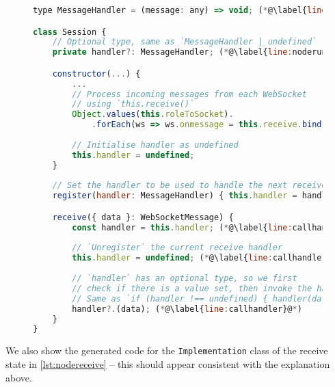 \begin{figure}[!h]
\begin{lstlisting}[language=javascript,tabsize=2]
type MessageHandler = (message: any) => void; (*@\label{line:msghandler}@*)

class Session {
	// Optional type, same as `MessageHandler | undefined`
	private handler?: MessageHandler; (*@\label{line:noderuntimehandler}@*)

	constructor(...) {
		...
		// Process incoming messages from each WebSocket
		// using `this.receive()`
		Object.values(this.roleToSocket).
			.forEach(ws => ws.onmessage = this.receive.bind(this)); (*@\label{line:wsbind}@*)
			
		// Initialise handler as undefined
		this.handler = undefined;
	}
	
	// Set the handler to be used to handle the next receive event
	register(handler: MessageHandler) { this.handler = handler; } (*@\label{line:register}@*)

	receive({ data }: WebSocketMessage) {
		const handler = this.handler; (*@\label{line:callhandlerstart}@*)
		
		// `Unregister` the current receive handler
		this.handler = undefined; (*@\label{line:callhandler2}@*)
		
		// `handler` has an optional type, so we first
		// check if there is a value set, then invoke the handler.
		// Same as `if (handler !== undefined) { handler(data); }`
		handler?.(data); (*@\label{line:callhandler}@*)
	}
}
\end{lstlisting}
\label{lst:noderuntimewsmsg}
\end{figure}

We also show the generated code for the \texttt{Implementation}
class of the receive state in \cref{lst:nodereceive}
-- this should appear consistent
with the explanation above.


